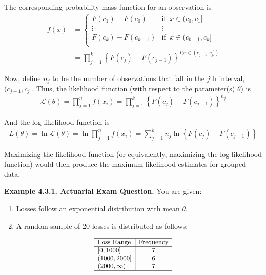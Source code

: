 \documentclass[]{book}
\providecommand{\tightlist}{%
  \setlength{\itemsep}{0pt}\setlength{\parskip}{0pt}}
\theoremstyle{definition}
\theoremstyle{definition}
\theoremstyle{definition}
\theoremstyle{remark}
\begin{document}
The corresponding probability mass function for an observation is
\[\begin{aligned}
f(x) &=
\begin{cases}
F(c_1) - F(c_{0}) &   \text{if }\ x \in (c_{0}, c_1]\\
\vdots & \vdots \\
F(c_k) - F(c_{k-1}) &   \text{if }\ x \in (c_{k-1}, c_k]\\
\end{cases} \\
&= \prod_{j=1}^k \left\{F(c_j) - F(c_{j-1})\right\}^{I(x \in (c_{j-1}, c_j])}
\end{aligned}\]

Now, define \(n_j\) to be the number of observations that fall in the
\(j\)th interval, \((c_{j-1}, c_j]\). Thus, the likelihood function
(with respect to the parameter(s) \(\theta\)) is \[\begin{aligned}
\mathcal{L}(\theta) = \prod_{j=1}^n f(x_i) = \prod_{j=1}^k \left\{F(c_j) - F(c_{j-1})\right\}^{n_j}
\end{aligned}\]

And the log-likelihood function is \[\begin{aligned}
L(\theta) = \ln \mathcal{L}(\theta) = \ln \prod_{j=1}^n f(x_i) = \sum_{j=1}^k n_j \ln \left\{F(c_j) - F(c_{j-1})\right\}
\end{aligned}\]

Maximizing the likelihood function (or equivalently, maximizing the
log-likelihood function) would then produce the maximum likelihood
estimates for grouped data.

\textbf{Example 4.3.1. Actuarial Exam Question.} You are given:

\begin{enumerate}
\def\labelenumi{(\roman{enumi})}
\tightlist
\item
  Losses follow an exponential distribution with mean \(\theta\).
\item
  A random sample of 20 losses is distributed as follows:
\end{enumerate}

\[
{\small
\begin{array}{l|c}
\hline
\text{Loss Range} & \text{Frequency} \\
\hline 
[0,1000] & 7 \\
(1000,2000] & 6 \\
(2000,\infty) & 7 \\
\hline
\end{array}
}
\]
\end{document}
